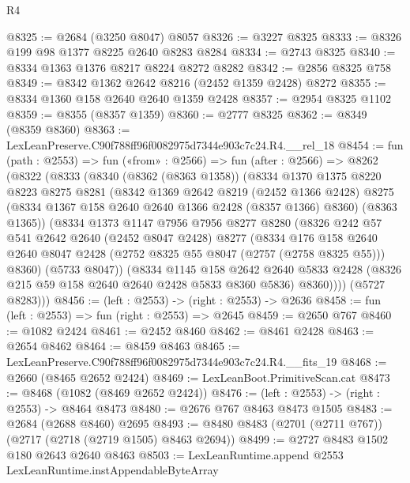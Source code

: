 \begin{lexlean}{R4}
\begin{coremodule}
@8325 := @2684 (@3250 @8047) @8057
@8326 := @3227 @8325
@8333 := @8326 @199 @98 @1377 @8225 @2640 @8283 @8284
@8334 := @2743 @8325
@8340 := @8334 @1363 @1376 @8217 @8224 @8272 @8282
@8342 := @2856 @8325 @758
@8349 := @8342 @1362 @2642 @8216 (@2452 @1359 @2428) @8272
@8355 := @8334 @1360 @158 @2640 @2640 @1359 @2428
@8357 := @2954 @8325 @1102
@8359 := @8355 (@8357 @1359)
@8360 := @2777 @8325
@8362 := @8349 (@8359 @8360)
@8363 := LexLeanPreserve.C90f788ff96f0082975d7344e903c7c24.R4.__rel_18
@8454 := fun (path : @2553) =>
  fun («from» : @2566) =>
  fun (after : @2566) =>
  @8262
    (@8322
      (@8333
        (@8340
          (@8362 (@8363 @1358))
          (@8334
            @1370
            @1375
            @8220
            @8223
            @8275
            @8281
            (@8342
              @1369
              @2642
              @8219
              (@2452 @1366 @2428)
              @8275
              (@8334 @1367 @158 @2640 @2640 @1366 @2428 (@8357 @1366) @8360)
              (@8363 @1365))
            (@8334
              @1373
              @1147
              @7956
              @7956
              @8277
              @8280
              (@8326
                @242
                @57
                @541
                @2642
                @2640
                (@2452 @8047 @2428)
                @8277
                (@8334
                  @176
                  @158
                  @2640
                  @2640
                  @8047
                  @2428
                  (@2752 @8325 @55 @8047 (@2757 (@2758 @8325 @55)))
                  @8360)
                (@5733 @8047))
              (@8334
                @1145
                @158
                @2642
                @2640
                @5833
                @2428
                (@8326 @215 @59 @158 @2640 @2640 @2428 @5833 @8360 @5836)
                @8360))))
        (@5727 @8283)))
@8456 := (left : @2553) -> (right : @2553) -> @2636
@8458 := fun (left : @2553) => fun (right : @2553) => @2645
@8459 := @2650 @767
@8460 := @1082 @2424
@8461 := @2452 @8460
@8462 := @8461 @2428
@8463 := @2654 @8462
@8464 := @8459 @8463
@8465 := LexLeanPreserve.C90f788ff96f0082975d7344e903c7c24.R4.__fits_19
@8468 := @2660 (@8465 @2652 @2424)
@8469 := LexLeanBoot.PrimitiveScan.cat
@8473 := @8468 (@1082 (@8469 @2652 @2424))
@8476 := (left : @2553) -> (right : @2553) -> @8464 @8473
@8480 := @2676 @767 @8463 @8473 @1505
@8483 := @2684 (@2688 @8460) @2695
@8493 := @8480 @8483 (@2701 (@2711 @767)) (@2717 (@2718 (@2719 @1505) @8463 @2694))
@8499 := @2727 @8483 @1502 @180 @2643 @2640 @8463
@8503 := LexLeanRuntime.append @2553 LexLeanRuntime.instAppendableByteArray

\end{coremodule}
\end{lexlean}
